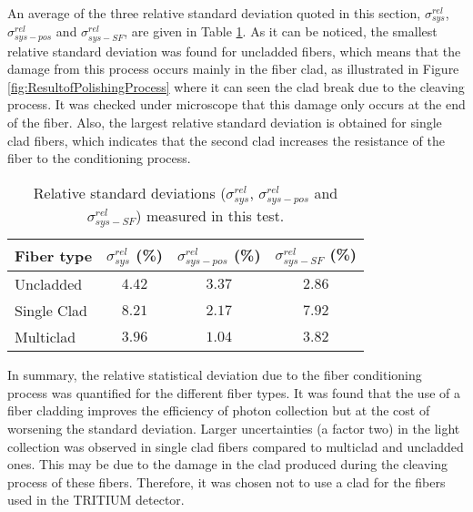 
An average of the three relative standard deviation quoted in this section, $\sigma^{rel}_{sys}$, $\sigma^{rel}_{sys-pos}$ and $\sigma^{rel}_{sys-SF}$,  are given in Table \ref{tab:RelativeStandardDeviations}. As it can be noticed, the smallest relative standard deviation was found for uncladded fibers, which means that the damage from this process occurs mainly in the fiber clad, as illustrated in Figure \ref{fig:ResultofPolishingProcess} where it can seen the clad break due to the cleaving process. It was checked under microscope that this damage only occurs at the end of the fiber. Also, the largest relative standard deviation is obtained for single clad fibers, which indicates that the second clad increases the resistance of the fiber to the conditioning process.

\begin{table}[htbp]
\centering{}%
\begin{tabular}{lccc}
\toprule 
Fiber type & $\sigma^{rel}_{sys}$ (\%) & $\sigma^{rel}_{sys-pos}$ (\%) & $\sigma^{rel}_{sys-SF}$ (\%) \tabularnewline
\midrule
\midrule 
Uncladded & $4.42$ & $3.37$ & $2.86$ \tabularnewline
Single Clad & $8.21$ & $2.17$ & $7.92$ \tabularnewline
Multiclad & $3.96$ & $1.04$ & $3.82$ \tabularnewline
\bottomrule
\end{tabular}
\caption{Relative standard deviations ($\sigma^{rel}_{sys}$, $\sigma^{rel}_{sys-pos}$ and $\sigma^{rel}_{sys-SF}$) measured in this test.}
\label{tab:RelativeStandardDeviations}
\end{table}

In summary, the relative statistical deviation due to the fiber conditioning process was quantified for the different fiber types. It was found that the use of a fiber cladding improves the efficiency of photon collection but at the cost of worsening the standard deviation. Larger uncertainties (a factor two) in the light collection was observed in single clad fibers compared to multiclad and uncladded ones. This may be due to the damage in the clad produced during the cleaving process of these fibers. Therefore, it was chosen not to use a clad for the fibers used in the TRITIUM detector.

